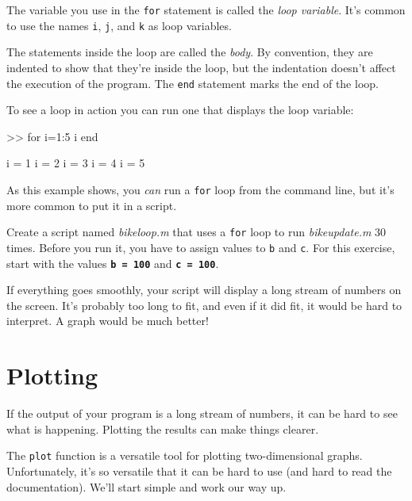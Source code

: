 The variable you use in the \lstinline{for} statement is called the \emph{loop
variable}.  It's common to use the names \lstinline{i},
\lstinline{j}, and \lstinline{k} as loop variables.


The statements inside the loop are called the \emph{body}.  By convention,
they are indented to show that they're inside the loop, but the
indentation doesn't affect the execution of the program.
The \lstinline{end} statement marks the end of the loop.


To see a loop in action you can run one that displays the
loop variable:

\begin{code}
>> for i=1:5
    i
end

i = 1
i = 2
i = 3
i = 4
i = 5
\end{code}

As this example shows, you \emph{can} run a \lstinline{for} loop from the
command line, but it's more common to put it in a script.

\begin{ex}
Create a script named \emph{bike\textunderscore loop.m} that uses a \lstinline{for} loop to run \emph{bike\textunderscore update.m} 30 times.  Before you run it, you have to assign values to \lstinline{b} and \lstinline{c}.
For this exercise, start with the values \textbf{\lstinline{b = 100}} and \textbf{\lstinline{c = 100}}.

If everything goes smoothly, your script will display a long stream
of numbers on the screen.  It's probably too long
to fit, and even if it did fit, it would be hard to interpret.
A graph would be much better!
\end{ex}



\section{Plotting}
\label{plotting}


If the output of your program is a long stream of numbers, it can be hard to see what is happening.
Plotting the results can make things clearer.

The \lstinline{plot} function is a versatile tool for plotting two-dimensional graphs.  Unfortunately, it's so versatile that it can be hard to use (and hard to read the documentation).
We'll start simple and work our way up.

